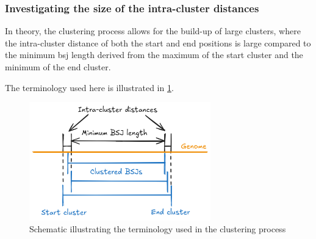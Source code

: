 \subsubsection{Investigating the size of the intra-cluster distances}

In theory, the clustering process allows for the build-up of large clusters,
where the intra-cluster distance of both the start and end positions is large
compared to the minimum \gls{bsj} length derived from the maximum of the start
cluster and the minimum of the end cluster.

The terminology used here is illustrated in \cref{fig:clustering_expl}.

\begin{figure}[ht]
    \centering

    \includegraphics[width=0.7\textwidth]{chapters/4_results_and_discussion/figures/grouping.png}
    \caption{Schematic illustrating the terminology used in the
        clustering process}
    \label{fig:clustering_expl}
\end{figure}

